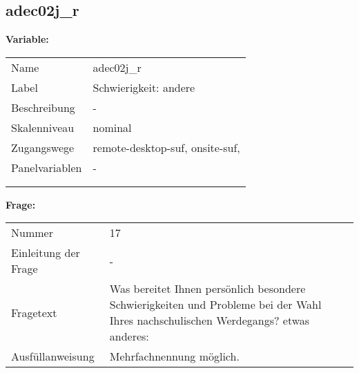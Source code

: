	
	
	\subsection{adec02j\_r}
	\label{subSection:adec02j_r}

	\noindent\textbf{Variable:}\\
		\begin{tabular}{lL{11.3cm}}
			\label{tableVariable:adec02j_r}
			Name & adec02j\_r \\
			Label & Schwierigkeit: andere \\
			Beschreibung & - \\
			Skalenniveau & nominal \\
			Zugangswege &
				remote-desktop-suf,
				onsite-suf,
 \\
			Panelvariablen & -
			 \\
			 \\
 \\
		\end{tabular}

		\vspace*{1 cm}
		\noindent\textbf{Frage:}\\
		\begin{tabular}{lL{11.3cm}}
			\label{tableQuestion:adec02j_r}
			Nummer & 17 \\
			Einleitung der Frage & - \\
			Fragetext & Was bereitet Ihnen persönlich besondere Schwierigkeiten und Probleme bei der Wahl Ihres nachschulischen Werdegangs?
etwas anderes: \\
			Ausfüllanweisung & Mehrfachnennung möglich. \\
		\end{tabular}





